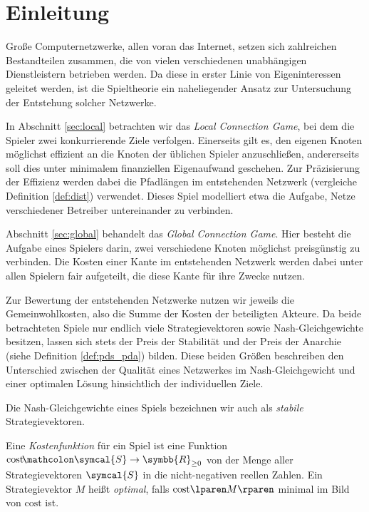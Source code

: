 \section{Einleitung}

Große Computernetzwerke, allen voran das Internet,
setzen sich zahlreichen Bestandteilen zusammen,
die von vielen verschiedenen unabhängigen Dienstleistern betrieben werden.
Da diese in erster Linie von Eigeninteressen geleitet werden,
ist die Spieltheorie ein naheliegender Ansatz
zur Untersuchung der Entstehung solcher Netzwerke.

In Abschnitt \ref{sec:local} betrachten wir das \emph{Local Connection Game},
bei dem die Spieler zwei konkurrierende Ziele verfolgen.
Einerseits gilt es, den eigenen Knoten möglichst effizient
an die Knoten der üblichen Spieler anzuschließen,
andererseits soll dies unter minimalem finanziellen Eigenaufwand geschehen.
Zur Präzisierung der Effizienz werden dabei
die Pfadlängen im entstehenden Netzwerk
(vergleiche Definition \ref{def:dist}) verwendet.
Dieses Spiel modelliert etwa die Aufgabe,
Netze verschiedener Betreiber untereinander zu verbinden.

Abschnitt \ref{sec:global} behandelt das \emph{Global Connection Game}.
Hier besteht die Aufgabe eines Spielers darin,
zwei verschiedene Knoten möglichst preisgünstig zu verbinden.
Die Kosten einer Kante im entstehenden Netzwerk
werden dabei unter allen Spielern fair aufgeteilt,
die diese Kante für ihre Zwecke nutzen.

Zur Bewertung der entstehenden Netzwerke
nutzen wir jeweils die Gemeinwohlkosten,
also die Summe der Kosten der beteiligten Akteure.
Da beide betrachteten Spiele nur endlich viele Strategievektoren
sowie Nash-Gleichgewichte besitzen,
lassen sich stets der Preis der Stabilität und der Preis der Anarchie
(siehe Definition \ref{def:pds_pda}) bilden.
Diese beiden Größen beschreiben den Unterschied
zwischen der Qualität eines Netzwerkes im Nash-Gleichgewicht
und einer optimalen Lösung hinsichtlich der individuellen Ziele.

\begin{definition}
  Die Nash-Gleichgewichte eines Spiels bezeichnen wir auch
  als \emph{stabile} Strategievektoren.
\end{definition}

\begin{definition}
  Eine \emph{Kostenfunktion} für ein Spiel
  ist eine Funktion
  $\mathrm{cost} \! \mathcolon \symcal{S} \rightarrow \symbb{R}_{ \geq 0 }$
  von der Menge aller Strategievektoren $\symcal{S}$
  in die nicht-negativen reellen Zahlen.
  Ein Strategievektor $M$ heißt \emph{optimal},
  falls $\cost{M}$ minimal im Bild von $\mathrm{cost}$ ist.
\end{definition}

